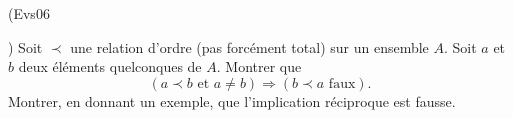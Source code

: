 \begin{tiny}(Evs06\end{tiny}) Soit $\prec$ une relation d'ordre (pas forcément total) sur un ensemble $A$. Soit $a$ et $b$ deux éléments quelconques de $A$.
Montrer que
\begin{displaymath}
 \left( a\prec b \text{ et } a\neq b \right) \Rightarrow \left( b\prec a \text{ faux} \right) .
\end{displaymath}
Montrer, en donnant un exemple, que l'implication réciproque est fausse.
